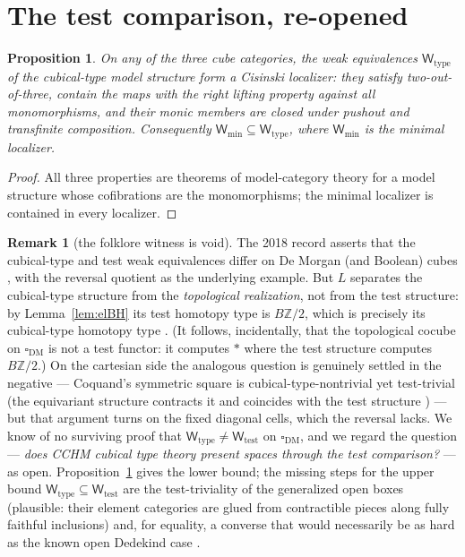 \documentclass[11pt]{amsart}
\newtheorem{prop}[thm]{Proposition}
\theoremstyle{definition}
\newtheorem{rem}[thm]{Remark}
\newcommand{\cube}{\square_{\mathrm{DM}}}
\newcommand{\Ldash}{L}
\newcommand{\Wtest}{\mathsf{W}_{\mathrm{test}}}
\newcommand{\Wtype}{\mathsf{W}_{\mathrm{type}}}
\newcommand{\Wmin}{\mathsf{W}_{\mathrm{min}}}
\begin{document}
\section{The test comparison, re-opened}
\label{sec:test}

\begin{prop}
  \label{prop:sandwich}
  On any of the three cube categories, the weak equivalences
  $\Wtype$ of the cubical-type model structure form a Cisinski
  localizer: they satisfy two-out-of-three, contain the maps with
  the right lifting property against all monomorphisms, and their
  monic members are closed under pushout and transfinite
  composition.  Consequently $\Wmin \subseteq \Wtype$, where
  $\Wmin$ is the minimal localizer.
\end{prop}

\begin{proof}
  All three properties are theorems of model-category theory for a
  model structure whose cofibrations are the monomorphisms; the
  minimal localizer is contained in every localizer.
\end{proof}

\begin{rem}[the folklore witness is void]
  \label{rem:void}
  The 2018 record asserts that the cubical-type and test weak
  equivalences differ on De Morgan (and Boolean) cubes
  \cite{CoqML}, with the reversal quotient as the underlying
  example.  But $\Ldash$ separates the cubical-type structure from
  the \emph{topological realization}, not from the test structure:
  by Lemma~\ref{lem:elBH} its test homotopy type is
  $B\mathbb{Z}/2$, which is precisely its cubical-type homotopy
  type \cite{Reversal}.  (It follows, incidentally, that the
  topological cocube on $\cube$ is not a test functor: it computes
  $*$ where the test structure computes $B\mathbb{Z}/2$.)  On the
  cartesian side the analogous question is genuinely settled in
  the negative --- Coquand's symmetric square is
  cubical-type-nontrivial \cite{CoqNote} yet test-trivial (the
  equivariant structure contracts it and coincides with the test
  structure \cite{ACCRS}) --- but that argument turns on the fixed
  diagonal cells, which the reversal lacks.  We know of no
  surviving proof that $\Wtype \neq \Wtest$ on $\cube$, and we
  regard the question --- \emph{does CCHM cubical type theory
  present spaces through the test comparison?} --- as open.
  Proposition~\ref{prop:sandwich} gives the lower bound; the
  missing steps for the upper bound
  $\Wtype \subseteq \Wtest$ are the test-triviality of the
  generalized open boxes (plausible: their element categories are
  glued from contractible pieces along fully faithful inclusions)
  and, for equality, a converse that would necessarily be as hard
  as the known open Dedekind case \cite{StreicherWeinberger,
  CavalloSattlerElegance}.
\end{rem}
\end{document}
